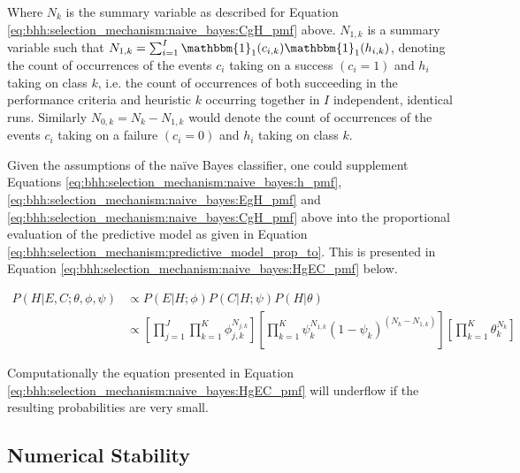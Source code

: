Where $N_{k}$ is the summary variable as described for Equation \ref{eq:bhh:selection_mechanism:naive_bayes:CgH_pmf} above.
$N_{1,k}$ is a summary variable such that $N_{1,k} = \sum_{i=1}^{I}
\mathbbm{1}_{1}(c_{i,k})\mathbbm{1}_{1}(h_{i,k})$, denoting the count of
occurrences of the events $c_{i}$ taking on a success $(c_{i}=1)$ and $h_{i}$
taking on class $k$, i.e. the count of occurrences of both succeeding in the
performance criteria and heuristic $k$ occurring together in $I$ independent,
identical runs. Similarly $N_{0,k} = N_{k} - N_{1,k}$ would denote the count of
occurrences of the events $c_{i}$ taking on a failure $(c_{i}=0)$ and $h_{i}$
taking on class $k$.


Given the assumptions of the naïve Bayes classifier, one could supplement Equations \ref{eq:bhh:selection_mechanism:naive_bayes:h_pmf}, \ref{eq:bhh:selection_mechanism:naive_bayes:EgH_pmf} and \ref{eq:bhh:selection_mechanism:naive_bayes:CgH_pmf} above into the proportional evaluation of the predictive model as given in Equation \ref{eq:bhh:selection_mechanism:predictive_model_prop_to}. This is presented in Equation \ref{eq:bhh:selection_mechanism:naive_bayes:HgEC_pmf} below.

\begin{equation}
    \label{eq:bhh:selection_mechanism:naive_bayes:HgEC_pmf}
    \begin{split}
        P(H \vert E, C;  \theta, \phi, \psi)
        &\propto P(E \vert H;  \phi)  P(C \vert H;  \psi) P(H \vert \theta)  \\
        &\propto \left[ \prod_{j=1}^{J} \prod_{k=1}^{K} \phi_{j,k}^{N_{j,k}} \right] \left[ \prod_{k=1}^{K} \psi_{k}^{N_{1,k}} (1 - \psi_{k})^{(N_{k} - N_{1,k})} \right] \left[ \prod_{k=1}^{K} \theta_{k}^{N_{k}} \right]
    \end{split}
\end{equation}

Computationally the equation presented in Equation \ref{eq:bhh:selection_mechanism:naive_bayes:HgEC_pmf} will underflow if the resulting probabilities are very small.


\subsection{Numerical Stability}
\label{sec:bhh:selection_mechanism:numerical_stability}

